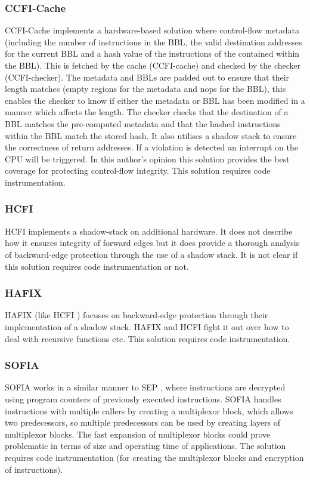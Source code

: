 \subsubsection{CCFI-Cache}
CCFI-Cache \cite{Danger2018} implements a hardware-based solution where control-flow metadata (including the number of instructions in the BBL, the valid destination addresses for the current BBL and a hash value of the instructions of the contained within the BBL). This is fetched by the cache (CCFI-cache) and checked by the checker (CCFI-checker). The metadata and BBLs are padded out to ensure that their length matches (empty regions for the metadata and nops for the BBL), this enables the checker to know if either the metadata or BBL has been modified in a manner which affects the length. The checker checks that the destination of a BBL matches the pre-computed metadata and that the hashed instructions within the BBL match the stored hash. It also utilises a shadow stack to ensure the correctness of return addresses. If a violation is detected an interrupt on the CPU will be triggered. In this author's opinion this solution provides the best coverage for protecting control-flow integrity. This solution requires code instrumentation.

\subsubsection{HCFI}
HCFI \cite{Danger2018} implements a shadow-stack on additional hardware. It does not describe how it ensures integrity of forward edges but it does provide a thorough analysis of backward-edge protection through the use of a shadow stack. It is not clear if this solution requires code instrumentation or not.

\subsubsection{HAFIX}
HAFIX \cite{Davi2015} (like HCFI \cite{Danger2018}) focuses on backward-edge protection through their implementation of a shadow stack. HAFIX and HCFI fight it out over how to deal with recursive functions etc. This solution requires code instrumentation.

\subsubsection{SOFIA}
SOFIA \cite{Davi2015} works in a similar manner to SEP \cite{Lee2019}, where instructions are decrypted using program counters of previously executed instructions. SOFIA handles instructions with multiple callers by creating a multiplexor block, which allows two predecessors, so multiple predecessors can  be used by creating layers of multiplexor blocks. The fast expansion of multiplexor blocks could prove problematic in terms of size and operating time of applications. The solution requires code instrumentation (for creating the multiplexor blocks and encryption of instructions).

